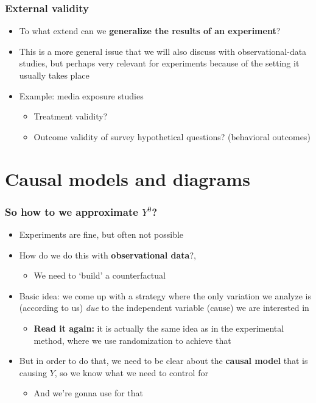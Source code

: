 \documentclass[aspectratio=43]{beamer}
\begin{document}
\begin{frame}
\frametitle{External validity}
\centering

\begin{itemize}
  \item To what extend can we \textbf{generalize the results of an experiment}?
  \item This is a more general issue that we will also discuss with observational-data studies, but perhaps very relevant for experiments because of the setting it usually takes place
  \item Example: media exposure studies
  \begin{itemize}
    \item Treatment validity?
    \item Outcome validity of survey hypothetical questions? (behavioral outcomes)
  \end{itemize}
\end{itemize}

\end{frame}

\section{Causal models and diagrams}

\begin{frame}
\frametitle{So how to we approximate $Y^{0}$?}
\centering

\begin{itemize}
  \item Experiments are fine, but often not possible
  \item<2-> How do we do this with \textbf{observational data}?,
    \begin{itemize}
      \item We need to `build' a counterfactual
    \end{itemize}
  \item<3-> Basic idea: we come up with a strategy where the only variation we analyze is (according to us) \textit{due} to the independent variable (cause) we are interested in
  \begin{itemize}
    \item \textbf{Read it again:} it is actually the same idea as in the experimental method, where we use randomization to achieve that
  \end{itemize}
  \item<4-> But in order to do that, we need to be clear about the \textbf{causal model} that is causing $Y$, so we know what we need to control for
  \begin{itemize}
    \item And we're gonna use  for that
  \end{itemize}
\end{itemize}

\end{frame}
\end{document}

